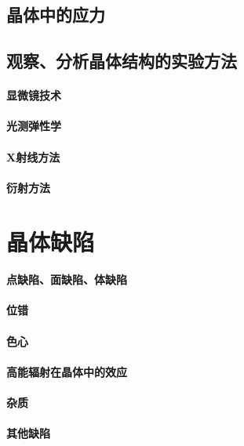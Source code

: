 \documentclass[UTF8]{../NatureUniverse}
\begin{document}
\section{晶体中的应力}
\section{观察、分析晶体结构的实验方法}
    \subsubsection{显微镜技术}
    \subsubsection{光测弹性学}
    \subsubsection{X射线方法}
    \subsubsection{衍射方法}









\chapter{晶体缺陷}
\subsubsection{点缺陷、面缺陷、体缺陷}
\subsubsection{位错}
\subsubsection{色心}
\subsubsection{高能辐射在晶体中的效应}
\subsubsection{杂质}
\subsubsection{其他缺陷}
\end{document}
